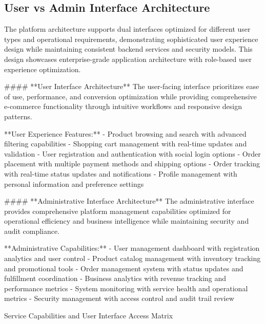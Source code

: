 \subsection{User vs Admin Interface Architecture}

The platform architecture supports dual interfaces optimized for different user types and operational requirements, demonstrating sophisticated user experience design while maintaining consistent backend services and security models. This design showcases enterprise-grade application architecture with role-based user experience optimization.

#### **User Interface Architecture**
The user-facing interface prioritizes ease of use, performance, and conversion optimization while providing comprehensive e-commerce functionality through intuitive workflows and responsive design patterns.

**User Experience Features:**
- Product browsing and search with advanced filtering capabilities
- Shopping cart management with real-time updates and validation
- User registration and authentication with social login options
- Order placement with multiple payment methods and shipping options
- Order tracking with real-time status updates and notifications
- Profile management with personal information and preference settings

#### **Administrative Interface Architecture**
The administrative interface provides comprehensive platform management capabilities optimized for operational efficiency and business intelligence while maintaining security and audit compliance.

**Administrative Capabilities:**
- User management dashboard with registration analytics and user control
- Product catalog management with inventory tracking and promotional tools
- Order management system with status updates and fulfillment coordination
- Business analytics with revenue tracking and performance metrics
- System monitoring with service health and operational metrics
- Security management with access control and audit trail review

\begin{table}[H]
\centering
\caption{Service Capabilities and User Interface Access Matrix}
\label{tab:service-capabilities-matrix}
\end{table}